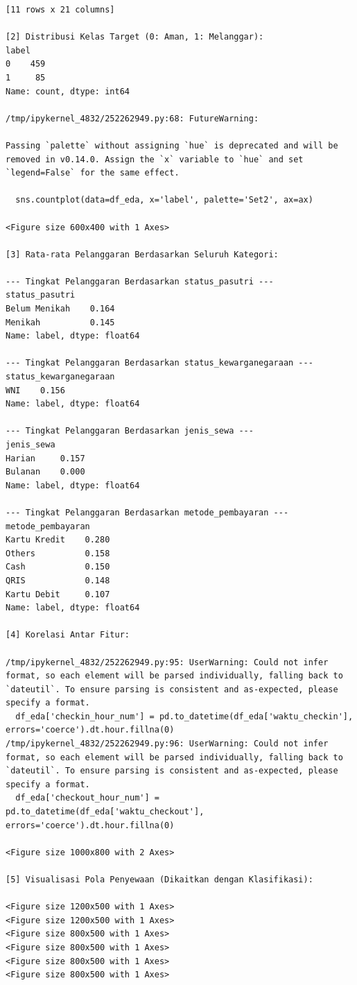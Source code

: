 \begin{lstlisting}[caption={Output 20}]
[11 rows x 21 columns]

[2] Distribusi Kelas Target (0: Aman, 1: Melanggar):
label
0    459
1     85
Name: count, dtype: int64

/tmp/ipykernel_4832/252262949.py:68: FutureWarning: 

Passing `palette` without assigning `hue` is deprecated and will be removed in v0.14.0. Assign the `x` variable to `hue` and set `legend=False` for the same effect.

  sns.countplot(data=df_eda, x='label', palette='Set2', ax=ax)

<Figure size 600x400 with 1 Axes>

[3] Rata-rata Pelanggaran Berdasarkan Seluruh Kategori:

--- Tingkat Pelanggaran Berdasarkan status_pasutri ---
status_pasutri
Belum Menikah    0.164
Menikah          0.145
Name: label, dtype: float64

--- Tingkat Pelanggaran Berdasarkan status_kewarganegaraan ---
status_kewarganegaraan
WNI    0.156
Name: label, dtype: float64

--- Tingkat Pelanggaran Berdasarkan jenis_sewa ---
jenis_sewa
Harian     0.157
Bulanan    0.000
Name: label, dtype: float64

--- Tingkat Pelanggaran Berdasarkan metode_pembayaran ---
metode_pembayaran
Kartu Kredit    0.280
Others          0.158
Cash            0.150
QRIS            0.148
Kartu Debit     0.107
Name: label, dtype: float64

[4] Korelasi Antar Fitur:

/tmp/ipykernel_4832/252262949.py:95: UserWarning: Could not infer format, so each element will be parsed individually, falling back to `dateutil`. To ensure parsing is consistent and as-expected, please specify a format.
  df_eda['checkin_hour_num'] = pd.to_datetime(df_eda['waktu_checkin'], errors='coerce').dt.hour.fillna(0)
/tmp/ipykernel_4832/252262949.py:96: UserWarning: Could not infer format, so each element will be parsed individually, falling back to `dateutil`. To ensure parsing is consistent and as-expected, please specify a format.
  df_eda['checkout_hour_num'] = pd.to_datetime(df_eda['waktu_checkout'], errors='coerce').dt.hour.fillna(0)

<Figure size 1000x800 with 2 Axes>

[5] Visualisasi Pola Penyewaan (Dikaitkan dengan Klasifikasi):

<Figure size 1200x500 with 1 Axes>
<Figure size 1200x500 with 1 Axes>
<Figure size 800x500 with 1 Axes>
<Figure size 800x500 with 1 Axes>
<Figure size 800x500 with 1 Axes>
<Figure size 800x500 with 1 Axes>


\end{lstlisting}
